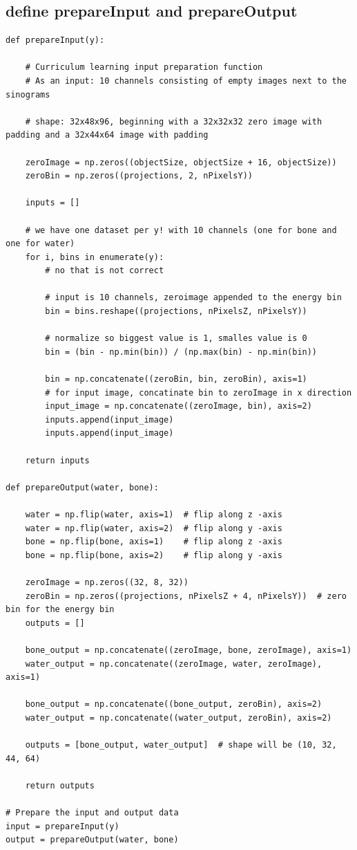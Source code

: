 \subsection{define prepareInput and prepareOutput}

\begin{verbatim}
def prepareInput(y):
    
    # Curriculum learning input preparation function
    # As an input: 10 channels consisting of empty images next to the sinograms

    # shape: 32x48x96, beginning with a 32x32x32 zero image with padding and a 32x44x64 image with padding

    zeroImage = np.zeros((objectSize, objectSize + 16, objectSize))
    zeroBin = np.zeros((projections, 2, nPixelsY))
    
    inputs = []

    # we have one dataset per y! with 10 channels (one for bone and one for water)
    for i, bins in enumerate(y):
        # no that is not correct
        
        # input is 10 channels, zeroimage appended to the energy bin
        bin = bins.reshape((projections, nPixelsZ, nPixelsY))
        
        # normalize so biggest value is 1, smalles value is 0
        bin = (bin - np.min(bin)) / (np.max(bin) - np.min(bin))
        
        bin = np.concatenate((zeroBin, bin, zeroBin), axis=1)
        # for input image, concatinate bin to zeroImage in x direction
        input_image = np.concatenate((zeroImage, bin), axis=2)
        inputs.append(input_image)
        inputs.append(input_image)
    
    return inputs

def prepareOutput(water, bone):

    water = np.flip(water, axis=1)  # flip along z -axis
    water = np.flip(water, axis=2)  # flip along y -axis
    bone = np.flip(bone, axis=1)    # flip along z -axis
    bone = np.flip(bone, axis=2)    # flip along y -axis
    
    zeroImage = np.zeros((32, 8, 32))
    zeroBin = np.zeros((projections, nPixelsZ + 4, nPixelsY))  # zero bin for the energy bin
    outputs = []
    
    bone_output = np.concatenate((zeroImage, bone, zeroImage), axis=1)
    water_output = np.concatenate((zeroImage, water, zeroImage), axis=1)

    bone_output = np.concatenate((bone_output, zeroBin), axis=2)
    water_output = np.concatenate((water_output, zeroBin), axis=2)
    
    outputs = [bone_output, water_output]  # shape will be (10, 32, 44, 64)
    
    return outputs

# Prepare the input and output data
input = prepareInput(y)
output = prepareOutput(water, bone)
\end{verbatim}


